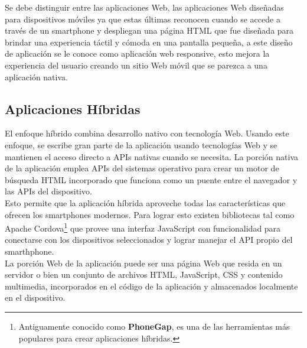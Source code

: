   Se debe distinguir entre las aplicaciones Web, las aplicaciones Web diseñadas para dispositivos móviles ya que estas últimas reconocen cuando se accede a través de un smartphone y despliegan una página HTML que fue diseñada para brindar una experiencia táctil y cómoda en una pantalla pequeña, a este diseño de aplicación se le conoce como aplicación web responsive, esto mejora la experiencia del usuario creando un sitio Web móvil que se parezca a una aplicación nativa.\\


  \subsection{Aplicaciones Híbridas}
  \label{sub:aplicaciones_hibridas}

    El enfoque híbrido combina desarrollo nativo con tecnología Web. Usando este enfoque, se escribe gran parte de la aplicación usando tecnologías Web y se mantienen el acceso directo a APIs nativas cuando se necesita. La porción nativa de la aplicación emplea APIs del sistemas operativo para crear un motor de búsqueda HTML incorporado que funciona como un puente entre el navegador y las APIs del dispositivo\cite{IBM_Mobile}.\\

    Esto permite que la aplicación híbrida aproveche todas las características que ofrecen los smartphones modernos. Para lograr esto existen bibliotecas tal como Apache Cordova\footnote{Antiguamente conocido como \textbf{PhoneGap}, es una de las herramientas más populares para crear aplicaciones híbridas.} que provee una interfaz JavaScript con funcionalidad para conectarse con los dispositivos seleccionados y lograr manejar el API propio del smarthphone.\\

    La porción Web de la aplicación puede ser una página Web que resida en un servidor o bien un conjunto de archivos HTML, JavaScript, CSS y contenido multimedia, incorporados en el código de la aplicación y almacenados localmente en el dispositivo\cite{IBM_Mobile}.\\



